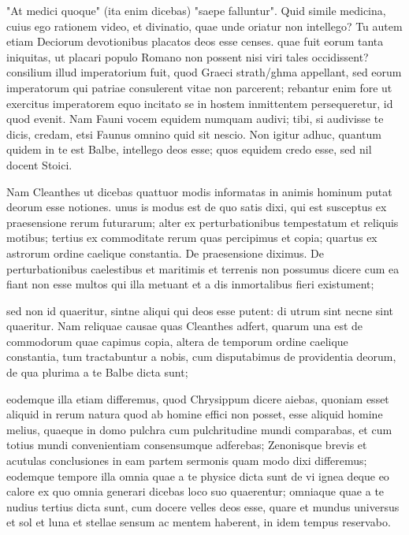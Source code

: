  "At medici quoque" (ita enim dicebas) "saepe falluntur". Quid simile medicina, cuius ego rationem video, et divinatio, quae unde oriatur non intellego? Tu autem etiam Deciorum devotionibus placatos deos esse censes. quae fuit eorum tanta iniquitas, ut placari populo Romano non possent nisi viri tales occidissent? consilium illud imperatorium fuit, quod Graeci strath/ghma appellant, sed eorum imperatorum qui patriae consulerent vitae non parcerent; rebantur enim fore ut exercitus imperatorem equo incitato se in hostem inmittentem persequeretur, id quod evenit. Nam Fauni vocem equidem numquam audivi; tibi, si audivisse te dicis, credam, etsi Faunus omnino quid sit nescio. Non igitur adhuc, quantum quidem in te est Balbe, intellego deos esse; quos equidem credo esse, sed nil docent Stoici.

 Nam Cleanthes ut dicebas quattuor modis informatas in animis hominum putat deorum esse notiones. unus is modus est de quo satis dixi, qui est susceptus ex praesensione rerum futurarum; alter ex perturbationibus tempestatum et reliquis motibus; tertius ex commoditate rerum quas percipimus et copia; quartus ex astrorum ordine caelique constantia. De praesensione diximus. De perturbationibus caelestibus et maritimis et terrenis non possumus dicere cum ea fiant non esse multos qui illa metuant et a dis inmortalibus fieri existument;

 sed non id quaeritur, sintne aliqui qui deos esse putent: di utrum sint necne sint quaeritur. Nam reliquae causae quas Cleanthes adfert, quarum una est de commodorum quae capimus copia, altera de temporum ordine caelique constantia, tum tractabuntur a nobis, cum disputabimus de providentia deorum, de qua plurima a te Balbe dicta sunt;

 eodemque illa etiam differemus, quod Chrysippum dicere aiebas, quoniam esset aliquid in rerum natura quod ab homine effici non posset, esse aliquid homine melius, quaeque in domo pulchra cum pulchritudine mundi comparabas, et cum totius mundi convenientiam consensumque adferebas; Zenonisque brevis et acutulas conclusiones in eam partem sermonis quam modo dixi differemus; eodemque tempore illa omnia quae a te physice dicta sunt de vi ignea deque eo calore ex quo omnia generari dicebas loco suo quaerentur; omniaque quae a te nudius tertius dicta sunt, cum docere velles deos esse, quare et mundus universus et sol et luna et stellae sensum ac mentem haberent, in idem tempus reservabo.

